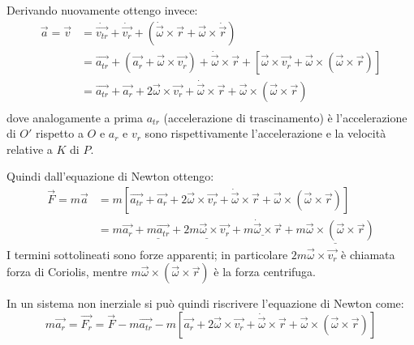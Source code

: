 \documentclass[../main.tex]{subfiles}
\begin{document}
Derivando nuovamente ottengo invece:
\begin{equation}\label{AccNonInerziale}
\begin{split}
	\overrightarrow{a}=\overrightarrow{v}	& =\dot{\overrightarrow{v_{tr}}}+\dot{\overrightarrow{v_r}}+\left(\dot{\overrightarrow{\omega}}\times\overrightarrow{r}+\overrightarrow{\omega}\times\dot{\overrightarrow{r}}\right)\\
											& =\overrightarrow{a_{tr}}+\left(\overrightarrow{a_r}+\overrightarrow{\omega}\times\overrightarrow{v_r}\right)+\dot{\overrightarrow{\omega}}\times\overrightarrow{r}+\left[\overrightarrow{\omega}\times\overrightarrow{v_r}+\overrightarrow{\omega}\times(\overrightarrow{\omega}\times\overrightarrow{r})\right]\\
											& =\overrightarrow{a_{tr}}+\overrightarrow{a_r}+2\overrightarrow{\omega}\times\overrightarrow{v_r}+\dot{\overrightarrow{\omega}}\times\overrightarrow{r}+\overrightarrow{\omega}\times(\overrightarrow{\omega}\times\overrightarrow{r})\\
\end{split}
\end{equation}
dove analogamente a prima $a_{tr}$ (accelerazione di trascinamento) è l'accelerazione di $O'$ rispetto a $O$ e $a_r$ e 
$v_r$ sono rispettivamente l'accelerazione e la velocità relative a $K$ di $P$.

Quindi dall'equazione di Newton ottengo:
\begin{equation*}
\begin{split}
	\overrightarrow{F}=m\overrightarrow{a}	& =m\left[\overrightarrow{a_{tr}}+\overrightarrow{a_r}+2\overrightarrow{\omega}\times\overrightarrow{v_r}+\dot{\overrightarrow{\omega}}\times\overrightarrow{r}+\overrightarrow{\omega}\times(\overrightarrow{\omega}\times\overrightarrow{r})\right]\\
											& =m\overrightarrow{a_r}+\underline{m\overrightarrow{a_{tr}}}+\underline{2m\overrightarrow{\omega}\times\overrightarrow{v_r}}+\underline{m\dot{\overrightarrow{\omega}}\times\overrightarrow{r}}+\underline{m\overrightarrow{\omega}\times(\overrightarrow{\omega}\times\overrightarrow{r})}
\end{split}
\end{equation*}
I termini sottolineati sono forze apparenti; in particolare $2m\overrightarrow{\omega}\times\overrightarrow{v_r}$
è chiamata forza di Coriolis, mentre $m\overrightarrow{\omega}\times(\overrightarrow{\omega}\times\overrightarrow{r})$
è la forza centrifuga.

In un sistema non inerziale si può quindi riscrivere l'equazione di Newton come:
\begin{equation}\label{ForzaNonInerziale}
	m\overrightarrow{a_r}=\overrightarrow{F_r}=\overrightarrow{F}-m\overrightarrow{a_{tr}}-m\left[\overrightarrow{a_r}+2\overrightarrow{\omega}\times\overrightarrow{v_r}+\dot{\overrightarrow{\omega}}\times\overrightarrow{r}+\overrightarrow{\omega}\times(\overrightarrow{\omega}\times\overrightarrow{r})\right]
\end{equation}
\end{document}
